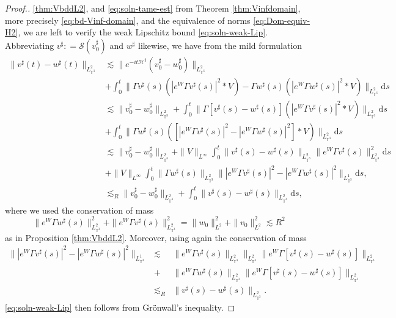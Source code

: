 {\begin{proof}[Proof.]
  \ref{thm:VbddL2}, and \eqref{eq:soln-tame-est} from Theorem
  \ref{thm:Vinfdomain}, more precisely \eqref{eq:bd-Vinf-domain}, and the
  equivalence of norms \eqref{eq:Dom-equiv-H2}, we are left to verify the weak
  Lipschitz bound \eqref{eq:soln-weak-Lip}. Abbreviating $v^{\sharp} :
  =\mathcal{S} (v^{\sharp}_0)$ and $w^{\sharp}$ likewise, we have from the
  mild formulation
  \begin{align*}
    \| v^{\sharp} (t) - w^{\sharp} (t) \|_{L_{\mathbb{T}^3}^2} & \lesssim  \|
    e^{- i t \mathcal{H}^{\sharp}} (v_0^{\sharp} - w_0^{\sharp})
    \|_{L_{\mathbb{T}^3}^2}\\
    &+ \int^t_0 \| \Gamma v^{\sharp} (s) (| e^W \Gamma v^{\sharp} (s) |^2
    \ast V) - \Gamma w^{\sharp} (s) (| e^W \Gamma w^{\sharp} (s) |^2 \ast V)
    \|_{L_{\mathbb{T}^3}^2} \mathrm{d} s\\
    & \lesssim \| v_0^{\sharp} - w_0^{\sharp} \|_{L_{\mathbb{T}^3}^2} +
    \int^t_0 \| \Gamma [v^{\sharp} (s) - w^{\sharp} (s)] (| e^W \Gamma
    v^{\sharp} (s) |^2 \ast V) \|_{L_{\mathbb{T}^3}^2} \mathrm{d} s\\
    &  + \int^t_0 \| \Gamma w^{\sharp} (s) ([| e^W \Gamma v^{\sharp} (s)
    |^2 - | e^W \Gamma w^{\sharp} (s) |^2] \ast V) \|_{L_{\mathbb{T}^3}^2}
    \mathrm{d} s\\
    & \lesssim \| v_0^{\sharp} - w_0^{\sharp} \|_{L_{\mathbb{T}^3}^2} + \|
    V \|_{L^{\infty}} \int^t_0 \| v^{\sharp} (s) - w^{\sharp} (s)
    \|_{L_{\mathbb{T}^3}^2} \| e^W \Gamma v^{\sharp} (s)
    \|^2_{L_{\mathbb{T}^3}^2} \mathrm{d} s\\
    & + \| V \|_{L^{\infty}} \int^t_0 \| \Gamma w^{\sharp} (s)
    \|_{L_{\mathbb{T}^3}^2} \| | e^W \Gamma v^{\sharp} (s) |^2 - | e^W \Gamma
    w^{\sharp} (s) |^2 \|_{L_{\mathbb{T}^3}^1} \mathrm{d} s,\\
    & \lesssim_R \| v_0^{\sharp} - w_0^{\sharp} \|_{L_{\mathbb{T}^3}^2} +
    \int^t_0 \| v^{\sharp} (s) - w^{\sharp} (s) \|_{L_{\mathbb{T}^3}^2} \mathrm{d}
    s,
  \end{align*}
  where we used the conservation of mass
  \[ \| e^W \Gamma w^{\sharp} (s) \|^2_{L_{\mathbb{T}^3}^2} + \| e^W \Gamma
     v^{\sharp} (s) \|^2_{L_{\mathbb{T}^3}^2} = \| w_0 \|^2_{L^2} + \| v_0
     \|^2_{L^2} \lesssim R^2 \]
  as in Proposition \ref{thm:VbddL2}. Moreover, using again the conservation
  of mass
  \begin{eqnarray*}
    \| | e^W \Gamma v^{\sharp} (s) |^2 - | e^W \Gamma w^{\sharp} (s) |^2
    \|_{L_{\mathbb{T}^3}^1} & \lesssim & \| e^W \Gamma v^{\sharp} (s)
    \|_{L_{\mathbb{T}^3}^2} 
    \|_{L_{\mathbb{T}^3}^2} \| e^W \Gamma [v^{\sharp} (s) - w^{\sharp}
    (s)] \|_{L_{\mathbb{T}^3}^2}\\
    &+& \| e^W \Gamma w^{\sharp} (s)
    \|_{L_{\mathbb{T}^3}^2} \| e^W \Gamma [v^{\sharp} (s) - w^{\sharp}
    (s)] \|_{L_{\mathbb{T}^3}^2} \\
    & \lesssim_R & \| v^{\sharp} (s) - w^{\sharp} (s) \|_{L_{\mathbb{T}^3}^2}.
  \end{eqnarray*}
  \eqref{eq:soln-weak-Lip} then follows from Gr{\"o}nwall's inequality.
\end{proof}}

